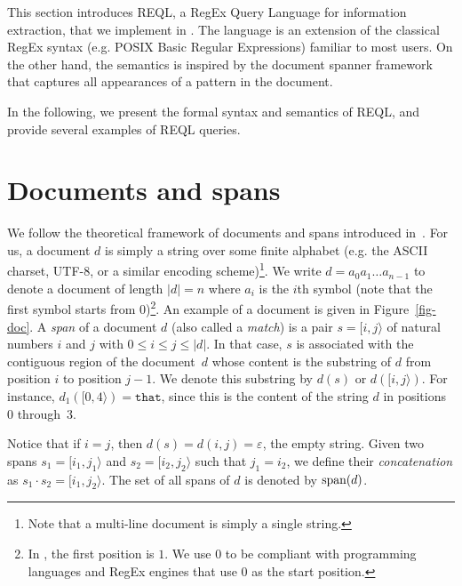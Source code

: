 
This section introduces REQL, a RegEx Query Language for information extraction,
that we implement in \rematch. The language is an extension of the classical
RegEx syntax (e.g. POSIX Basic Regular Expressions) familiar to most users. On
the other hand, the semantics is inspired by the document spanner
framework~\citep{FaginKRV15} that captures all appearances of a pattern in the
document. 

In the following, we present the formal syntax and semantics of REQL, and
provide several examples of REQL queries.

\section{Documents and spans}

We follow the theoretical framework of documents and spans introduced
in~\citep{FaginKRV15}. For us, a document $d$ is simply a string over some
finite alphabet (e.g. the ASCII charset, UTF-8, or a similar encoding
scheme)\footnote{Note that a multi-line document is simply a single string.}. We
write $d = a_0a_1 \ldots a_{n-1}$ to denote a document of length $|d| = n$ where
$a_{i}$ is the $i$th symbol (note that the first symbol starts from
$0$)\footnote{In \citet{FaginKRV15}, the first position is $1$. We use $0$ to be
compliant with programming languages and RegEx engines that use $0$ as the start
position.}. An example of a document is given in Figure~\ref{fig-doc}. A
\emph{span} of a document $d$ (also called a \emph{match}) is a pair $s =
[i,j\rangle$ of natural numbers $i$ and $j$ with $0 \leq i \leq j\leq |d|$. In
that case, $s$ is associated with the contiguous region of the document~$d$
whose content is the substring of $d$ from position $i$ to position $j-1$. We
denote this substring by $d(s)$ or $d([i,j\rangle)$. For instance,
$d_1([0,4\rangle) = \texttt{that}$, since this is the content of the string $d$
in positions 0 through~3.

Notice that if $i = j$, then $d(s) = d(i,j) = \varepsilon$, the empty string.
Given two spans $s_1 = [i_1, j_1\rangle$ and $s_2 = [i_2, j_2\rangle$ such that
$j_1 = i_2$, we define their \emph{concatenation} as $s_1 \cdot s_2=[i_1,
j_2\rangle$. The set of all spans of $d$ is denoted by $\text{span}(d)$.



